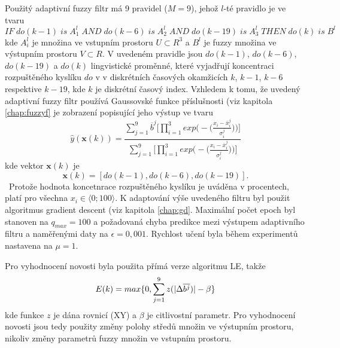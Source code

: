 \documentclass[11pt,twoside,openright]{report}
\DeclarePairedDelimiter\abs{\lvert}{\rvert}%
\begin{document}
\begin{appendices}
\par
Použitý adaptivní fuzzy filtr má 9 pravidel ($M=9$), jehož $l$-té pravidlo je ve tvaru
\begin{equation}
    IF\;do(k-1)\; is\; A_1^l\;AND\;do(k-6)\;is\;A_2^l\;AND\;do(k-19)\;is\;A_3^l\;THEN\;do(k)\;is\;B^l
\end{equation}
kde $A_i^l$ je množina ve vstupním prostoru $U \subset R^3$ a $B^l$ je fuzzy množina ve výstupním prostoru $V \subset R$. V uvedeném pravidle jsou $do(k-1)$, $do(k-6)$, $do(k-19)$ a $do(k)$ lingvistické proměnné, které vyjadřují koncentraci rozpuštěného kyslíku $do$ v v diskrétních časových okamžicích $k$, $k-1$, $k-6$ respektive $k-19$, kde $k$ je diskrétní časový index. Vzhledem k tomu, že uvedený adaptivní fuzzy filtr používá Gaussovské funkce příslušnosti (viz kapitola \ref{chap:fuzzyf} je zobrazení popisující jeho výstup ve tvaru
\begin{equation}
    \hat{y}(\textbf{x}(k))=\frac{\sum_{j=1}^9 \overline{b}^j\Big[\prod_{i=1}^3 exp\Big(-\Big(\frac{x_i-\overline{x}_i^j}{\sigma_i^j}\Big)\Big)\Big]}{\sum_{j=1}^9 \Big[\prod_{i=1}^3 exp\Big(-\Big(\frac{x_i-\overline{x}_i^j}{\sigma_i^j}\Big)\Big)\Big]}
\end{equation}
kde vektor $\textbf{x}(k)$ je
\begin{equation}
    \textbf{x}(k)=[do(k-1),do(k-6),do(k-19)].
\end{equation}\
Protože hodnota koncetnrace rozpuštěného kyslíku je uváděna v procentech, platí pro všechna $x_i\in \langle 0;100\rangle$. K adaptování výše uvedeného filtru byl použit algoritmus gradient descent (viz kapitola \ref{chap:gd}. Maximální počet epoch byl stanoven na $q_{max}=100$ a požadovaná chyba predikce mezi výstupem adaptivního filtru a naměřenými daty na $\epsilon=0,001$. Rychlost učení byla během experimentů nastavena na $\mu=1$.
\par
Pro vyhodnocení novosti byla použita přímá verze algoritmu LE, takže
\begin{equation}\label{eq:le_putida}
    E(k)=max\{0, \sum_{j=1}^9 z(\abs{\Delta \overline{b^j})}-\beta\}
\end{equation}
kde funkce $z$ je dána rovnicí (XY) a $\beta$ je citlivostní parametr. Pro vyhodnocení novosti jsou tedy použity změny polohy středů množin ve výstupním prostoru, nikoliv změny parametrů fuzzy množin ve vstupním prostoru.


\end{appendices}
\end{document}
